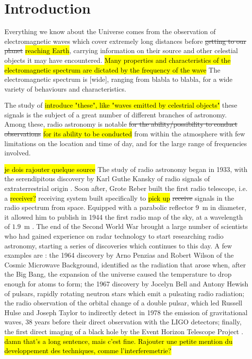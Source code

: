 \section{Introduction}
Everything we know about the Universe comes from the observation of electromagnetic waves which cover extremely long distances before \st{getting to our planet} \hl{reaching Earth}, carrying information on their source and other celestial objects it may have encountered.
\hl{Many properties and characteristics of the electromagnetic spectrum are dictated by the frequency of the wave}
The electromagnetic spectrum is [wide], ranging from blabla to blabla, for a wide variety of behaviours and characteristics.

The study of \hl{introduce "these", like "waves emitted by celestrial objects"} these signals is the subject of a great number of different branches of astronomy. Among these, radio astronomy is notable \st{for the ability/possibility to conduct observations} \hl{for its ability to be conducted} from within the atmosphere with few limitations on the location and time of day, and for the large range of frequencies involved.

\hl{je dois rajouter quelque source} The study of radio astronomy began in 1933, with the serendipitous discovery by Karl Guthe Kansky of radio signals of extraterrestrial origin \cite{condon_essential_2016}. 
Soon after, Grote Reber built the first radio telescope, i.e. a \hl{receiver?} receiving system built specifically to \hl{pick up} \st{receive} signals in the radio spectrum from space. Equipped with a parabolic reflector \mbox{9 m} in diameter, it allowed him to publish in 1944 the first radio map of the sky, at a wavelength of \mbox{$1.9$ m} \cite{lauterbach_radio_2022}.
The end of the Second World War brought a large number of scientists who had gained experience on radar technology to start researching radio astronomy, starting a series of discoveries which continues to this day.
A few examples are \cite{lauterbach_radio_2022}: 
the 1964 discovery by Arno Penzias and Robert Wilson of the Cosmic Microwave Background, identified as the radiation that arose when, after the Big Bang, the expansion of the universe caused the temperature to drop enough for atoms to form;
the 1967 discovery by Jocelyn Bell and Antony Hewish of pulsars, rapidly rotating neutron stars which emit a pulsating radio radiation; 
the radio observation of the orbital change of a double pulsar, which led Russell Hulse and Joseph Taylor to indirectly detect in 1978 the emission of gravitational waves, 38 years before their direct observation with the LIGO detectors;
finally, the first direct imaging of a black hole by the Event Horizon Telescope Project \cite{the_event_horizon_telescope_collaboration_first_2019}.
\hl{damn that's a long sentence, mais c'est fine. Rajouter une petite mention du developpement des techniques, comme l'interferemetrie?}

